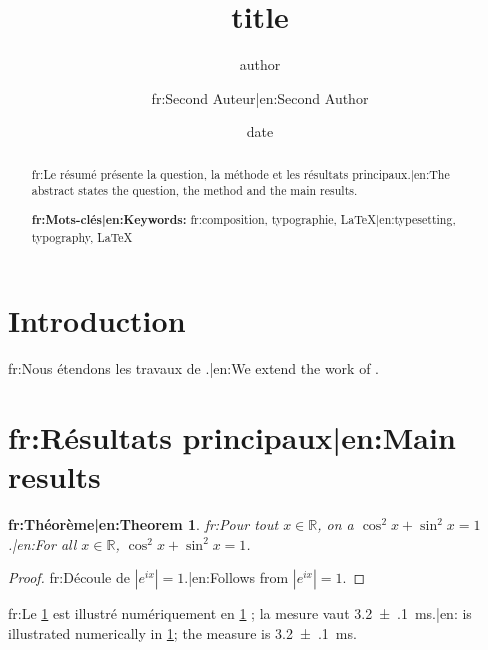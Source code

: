 \documentclass[11pt,a4paper]{article}
\title{{{title}}}
\author[1]{{{author}}}
\author[2]{{{fr:Second Auteur|en:Second Author}}}
\affil[1]{{{institution}}}
\affil[2]{{{fr:Autre laboratoire|en:Another laboratory}}}
\date{{{date}}}
\newtheorem{theorem}{{{fr:Théorème|en:Theorem}}}
\begin{document}
\maketitle

\begin{abstract}
  {{fr:Le résumé présente la question, la méthode et les résultats principaux.|en:The abstract states the question, the method and the main results.}}

  \medskip\noindent\textbf{{{fr:Mots-clés|en:Keywords}}:} {{fr:composition, typographie, LaTeX|en:typesetting, typography, LaTeX}}
\end{abstract}

\section{Introduction}\label{sec:intro}
{{fr:Nous étendons les travaux de \cite{knuth1984, lamport1994}.|en:We extend the work of \cite{knuth1984, lamport1994}.}}

\section{{{fr:Résultats principaux|en:Main results}}}\label{sec:results}
\begin{theorem}\label{thm:main}
  {{fr:Pour tout $x \in \mathbb{R}$, on a $\cos^2 x + \sin^2 x = 1$.|en:For all $x \in \mathbb{R}$, $\cos^2 x + \sin^2 x = 1$.}}
\end{theorem}
\begin{proof}
  {{fr:Découle de $|e^{ix}| = 1$.|en:Follows from $|e^{ix}| = 1$.}}
\end{proof}

{{fr:Le \cref{thm:main} est illustré numériquement en \cref{sec:intro} ; la mesure vaut \qty{3.2(1)}{\milli\second}.|en: is illustrated numerically in \cref{sec:intro}; the measure is \qty{3.2(1)}{\milli\second}.}}

\printbibliography
\end{document}
